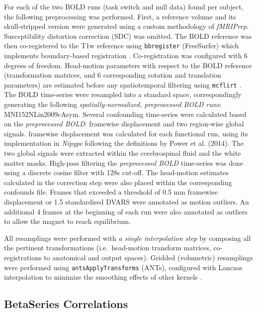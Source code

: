 \documentclass[10pt,letterpaper]{article}
\begin{document}
For each of the two BOLD runs (task switch and null data) found per subject,
the following preprocessing was performed.
First, a reference volume and its skull-stripped version were generated
using a custom methodology of \emph{fMRIPrep}.
Susceptibility distortion correction (SDC) was omitted.
The BOLD reference was then co-registered to the T1w reference using \texttt{bbregister}
(FreeSurfer) which implements boundary-based registration \cite{bbr}.
Co-registration was configured with 6 degrees of freedom.
Head-motion parameters with respect to the BOLD reference (transformation matrices,
and 6 corresponding rotation and translation parameters) are estimated before any
spatiotemporal filtering using \texttt{mcflirt} \cite[FSL 5.0.9,]{mcflirt}.
The BOLD time-series were resampled into a standard space, correspondingly
generating the following \emph{spatially-normalized, preprocessed BOLD runs}:
MNI152NLin2009cAsym.
Several confounding time-series were calculated based on the \emph{preprocessed BOLD}:
framewise displacement and two region-wise global signals.
framewise displacement was calculated for each functional run, using its
implementation in \emph{Nipype} following the definitions
by Power et al. (2014)\cite{power_fd_dvars}.
The two global signals were extracted within the
cerebrospinal fluid and the white matter masks.
High-pass filtering the \emph{preprocessed BOLD} time-series was done using
a discrete cosine filter with 128s cut-off.
The head-motion estimates calculated in
the correction step were also placed within the corresponding confounds file. 
Frames that exceeded a threshold of 0.5 mm framewise displacement or 1.5 standardised DVARS
were annotated as motion outliers.
An additional 4 frames at the beginning of each run were also
annotated as outliers to allow the magnet to reach equilibrium.

All resamplings were performed with \emph{a single interpolation step} by composing all the pertinent
transformations (i.e.~head-motion transform matrices, co-registrations to anatomical
and output spaces).
Gridded (volumetric) resamplings were performed using \texttt{antsApplyTransforms} (ANTs),
configured with Lanczos interpolation to minimize the smoothing effects of other kernels
\cite{lanczos}.

\subsection*{BetaSeries Correlations}
\label{methods:bsc}
\end{document}
